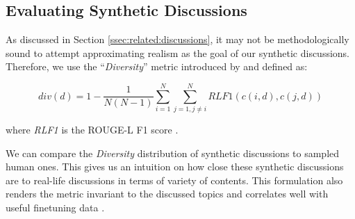 




\subsection{Evaluating Synthetic Discussions}
\label{ssec:methodology:diversity}

As discussed in Section \ref{ssec:related:discussions}, it may not be methodologically sound to attempt approximating realism as the goal of our synthetic discussions. Therefore, we use the “\textit{Diversity}” metric introduced by \citet{ulmer2024} and defined as:

\small
\begin{equation}
\label{eq:variety}
    div(d) = 1- \frac{1}{N(N-1)} \sum_{i=1}^N \sum_{j=1, j \neq i}^N \textit{RLF1}(c(i, d), c(j, d))
\end{equation}
\normalsize

\noindent where \textit{RLF1} is the ROUGE-L F1 score \cite{lin-2004-rouge}.

We can compare the \textit{Diversity} distribution of synthetic discussions to sampled human ones. This gives us an intuition on how close these synthetic discussions are to real-life discussions in terms of variety of contents. This formulation also renders the metric invariant to the discussed topics and correlates well with useful finetuning data \cite{ulmer2024}.